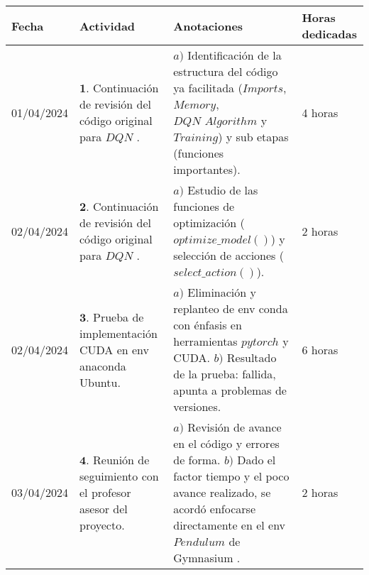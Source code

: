 \documentclass[12pt]{article}
\begin{document}
\begin{minipage}[h]{\textwidth}
	\centering
	\begin{tabularx}{\textwidth}{|p{2cm}|X|X|p{2cm}|} 
		\hline
		\rowcolor{encabezado}
		\textbf{Fecha} & 
		\textbf{Actividad} & 
		\textbf{Anotaciones} & 
		\textbf{Horas dedicadas} \\ \hline
	 	01/04/2024 & 
	 	$\mathbf{1}.$ Continuación de revisión del código original para $DQN$ \cite{DQNCart}. & 
	 	$a)$ Identificación de la estructura del código ya facilitada ($Imports$, $Memory$, $DQN\,\, Algorithm$ y $Training$) y sub etapas (funciones importantes). \newline & 
	 	4 horas \\
		02/04/2024 & 
	 	$\mathbf{2}.$ Continuación de revisión del código original para $DQN$ \cite{DQNCart}. &
	 	$a)$ Estudio de las funciones de optimización ($optimize\_ model()$) y selección de acciones ($select\_ action()$). \newline & 
	 	2 horas \\
		02/04/2024 & 
	 	$\mathbf{3}.$ Prueba de implementación CUDA en env anaconda Ubuntu. &
	 	$a)$ Eliminación y replanteo de env conda con énfasis en herramientas $pytorch$ y CUDA. \newline
	 	$b)$ Resultado de la prueba: fallida, apunta a problemas de versiones. \newline & 
	 	6 horas \\
	 	03/04/2024 & 
	 	$\mathbf{4}.$ Reunión de seguimiento con el profesor asesor del proyecto. & 
	 	$a)$ Revisión de avance en el código y errores de forma.  \newline
	 	$b)$ Dado el factor tiempo y el poco avance realizado, se acordó enfocarse directamente en el env $Pendulum$ de Gymnasium \cite{gym}.  \newline & 
	 	2 horas \\
	 	\hline
	\end{tabularx}
\end{minipage}	 	
	 	
\end{document}
